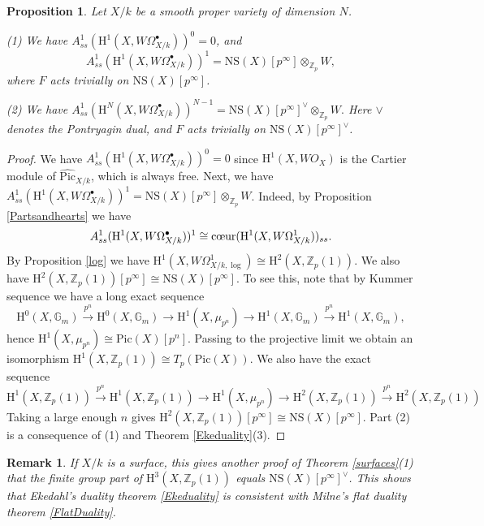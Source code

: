 \documentclass[a4paper,12pt,twoside]{report}
\newtheorem{proposition}[theorem]{Proposition}
\newtheorem{remark}[theorem]{Remark}
\newcommand{\Z}{\mathbb{Z}}
\newcommand{\G}{\mathbb{G}}
\newcommand{\Pic}{\mathrm{Pic}}
\newcommand{\NS}{\mathrm{NS}}
\newcommand{\HH}{\mathrm{H}}
\begin{document}
\begin{proposition}\label{A1ssH11}
    Let $X/k$ be a smooth proper variety of dimension $N$. 
    
    {\rm (1)} We have $A^1_{ss}(\HH^1(X,W\Omega^\bullet_{X/k}))^0=0$, and 
$$A^1_{ss}(\HH^1(X,W\Omega^\bullet_{X/k}))^1=\NS(X)[p^\infty]\otimes_{\Z_p} W,$$
where $F$ acts trivially on $\NS(X)[p^\infty]$. 

    {\rm (2)} We have $A^1_{ss}(\HH^N(X,W\Omega^\bullet_{X/k}))^{N-1}=\NS(X)[p^\infty]^\vee\otimes_{\Z_p}W.$ Here $\vee$ denotes the Pontryagin dual, and $F$ acts trivially on $\NS(X)[p^\infty]^\vee$. 
\end{proposition}

\begin{proof}
 We have    $A^1_{ss}(\HH^1(X,W\Omega^\bullet_{X/k}))^0=0$ since
$\HH^1(X,WO_X)$ is the Cartier module of $\widehat{\Pic}_{X/k}$, which is always free. 
Next, we have 
$A^1_{ss}(\HH^1(X,W\Omega^\bullet_{X/k}))^1=\NS(X)[p^\infty]\otimes_{\Z_p} W$.
Indeed,
by Proposition \ref{Partsandhearts} we have \[A^1_{ss}(\HH^1(X,W\Omega^\bullet_{X/k}))^1\cong \text{\rm {c\oe ur}}(\HH^1(X,W\Omega^1_{X/k}))_{ss}.\] 
By Proposition \ref{log} we have $\HH^1(X,W\Omega^1_{X/k,\log})\cong \HH^2(X,\Z_p(1))$.
We also have $\HH^2(X,\Z_p(1))[p^\infty]\cong \NS(X)[p^\infty]$. To see this, note that
by Kummer sequence we have a long exact sequence
\[\HH^0(X,\G_m)\xrightarrow{p^n} \HH^0(X,\G_m)\rightarrow \HH^1(X,\mu_{p^n})\rightarrow \HH^1(X,\G_m)\xrightarrow{p^n} \HH^1(X,\G_m),\]
hence $\HH^1(X,\mu_{p^n})\cong \Pic(X)[p^n]$. Passing to the projective limit we obtain an isomorphism
$\HH^1(X,\Z_p(1))\cong T_p(\Pic(X))$. 
We also have the exact sequence 
\[\HH^1(X,\Z_p(1))\xrightarrow{p^n}\HH^1(X,\Z_p(1))\rightarrow \HH^1(X,\mu_{p^n})\rightarrow \HH^2(X,\Z_p(1)) \xrightarrow{p^n} \HH^2(X,\Z_p(1))\]
Taking a large enough $n$ gives $\HH^2(X,\Z_p(1))[p^\infty]\cong \NS(X)[p^\infty]$. Part
(2) is a consequence of (1) and Theorem \ref{Ekeduality}(3). 
\end{proof}

\begin{remark} {\rm
    If $X/k$ is a surface, this gives another proof of Theorem \ref{surfaces}(1) that the finite group part of 
    $\HH^3(X,\Z_p(1))$ equals $\NS(X)[p^\infty]^\vee$. 
    This shows that Ekedahl's duality theorem \ref{Ekeduality} is consistent with Milne's flat duality theorem \ref{FlatDuality}. }
\end{remark}
\end{document}

